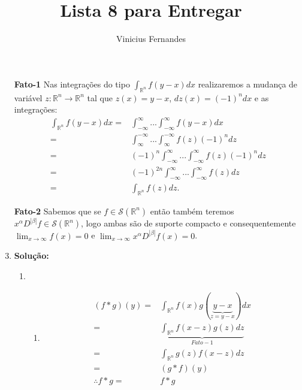 \documentclass{article}
\begin{document}
	
	\title{Lista 8 para Entregar}
	\author{Vinicius Fernandes}
	
	\maketitle
	
	\begin{enumerate}
		\item[\textbf{Fato-1}] Nas integrações do tipo $\int_{\mathbb{R}^{n}}f(y-x)dx$ realizaremos a mudança de variável $z: \mathbb{R}^{n} \to \mathbb{R}^{n}$ tal que $z(x) = y-x$, $dz(x) = (-1)^{n}dx$ e as integrações: 
		$$
		\begin{aligned}
		\int_{\mathbb{R}^{n}}f(y-x)dx = & \int_{-\infty}^{\infty} ...\int_{-\infty}^{\infty} f(y-x)dx
		\\
		= & \int_{\infty}^{-\infty} ...\int_{\infty}^{-\infty} f(z)(-1)^{n}dz
		\\
		= & (-1)^{n}\int_{-\infty}^{\infty} ...\int_{-\infty}^{\infty} f(z)(-1)^{n}dz
		\\
		= & (-1)^{2n}\int_{-\infty}^{\infty} ...\int_{-\infty}^{\infty} f(z)dz
		\\
		= & \int_{\mathbb{R}^{n}} f(z)dz.
		\end{aligned}$$
		
		\item[\textbf{Fato-2}] Sabemos que se $f \in \mathcal{S}(\mathbb{R}^{n})$ então também teremos $x^{\alpha}D^{|\beta|}f \in \mathcal{S}(\mathbb{R}^{n})$, logo ambas são de suporte compacto e consequentemente $\lim_{x \to \infty}f(x)=0$ e $\lim_{x \to \infty}x^{\alpha}D^{|\beta|}f(x)=0$.
		
		\item \textbf{Solução:}
			\begin{enumerate}
				\item 
					\begin{enumerate}
						\item 
						$$
						\begin{aligned}
						(f*g)(y) = & \int_{\mathbb{R}^{n}}f(x)g(\underbrace{ y-x }_{z=y-x})dx
						\\
						=& \underbrace{ \int_{\mathbb{R}^{n}}f(x-z)g(z)dz }_{Fato-1}
						\\
						= & \int_{\mathbb{R}^{n}}g(z)f(x-z)dz
						\\
						= & (g*f)(y)
						\\
						\therefore f*g = & f*g
						\end{aligned}
						$$
						

\end{enumerate}
\end{enumerate}
\end{enumerate}
\end{document}
